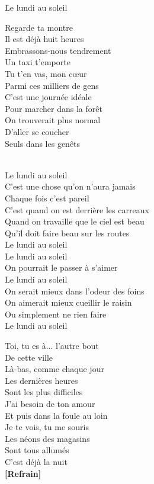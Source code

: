 \documentclass{novel}
\begin{document}
\newpage
\h*{Le lundi au soleil}

\begin{multicols}{2}
Regarde ta montre\\
Il est déjà huit heures\\
Embrassons-nous tendrement\\
Un taxi t'emporte\\
Tu t'en vas, mon cœur\\
Parmi ces milliers de gens\\
C'est une journée idéale\\
Pour marcher dans la forêt\\
On trouverait plus normal\\
D'aller se coucher\\
Seuls dans les genêts\\

\begin{bfseries}
[Refrain:]\\
Le lundi au soleil\\
C'est une chose qu'on n'aura jamais\\
Chaque fois c'est pareil\\
C'est quand on est derrière les carreaux\\
Quand on travaille que le ciel est beau\\
Qu'il doit faire beau sur les routes\\
Le lundi au soleil\\

Le lundi au soleil\\
On pourrait le passer à s'aimer\\
Le lundi au soleil\\
On serait mieux dans l'odeur des foins\\
On aimerait mieux cueillir le raisin\\
Ou simplement ne rien faire\\
Le lundi au soleil\\
\end{bfseries}

Toi, tu es à... l'autre bout\\
De cette ville\\
Là-bas, comme chaque jour\\
Les dernières heures\\
Sont les plus difficiles\\
J'ai besoin de ton amour\\
Et puis dans la foule au loin\\
Je te vois, tu me souris\\
Les néons des magasins\\
Sont tous allumés\\
C'est déjà la nuit\\

\textbf{[Refrain]}\\
\end{multicols}
\end{document}
